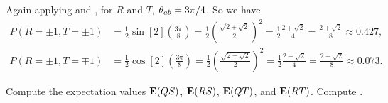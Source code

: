 \begin{solution}
	Again applying  and , for $R$ and $T$, $\theta_{ab} = 3\pi / 4$.  So we have
	\begin{align*}
		P(R=\pm1, T=\pm1) &= \frac{1}{2} \sin[2](\frac{3\pi}{8})
		= \frac{1}{2} \left( \frac{\sqrt{2 + \sqrt{2}}}{2} \right)^2
		= \frac{1}{2} \frac{2 + \sqrt{2}}{4}
		= \frac{2 + \sqrt{2}}{8}
		\approx 0.427, \\
		P(R=\pm1, T=\mp1) &= \frac{1}{2} \cos[2](\frac{3\pi}{8})
		= \frac{1}{2} \left( \frac{\sqrt{2 - \sqrt{2}}}{2} \right)^2
		= \frac{1}{2} \frac{2 - \sqrt{2}}{4}
		= \frac{2 - \sqrt{2}}{8}
		\approx 0.073.
	\end{align*}
	\vfix
\end{solution}



\begin{problem}
	Compute the expectation values $\vb{E}(QS)$, $\vb{E}(RS)$, $\vb{E}(QT)$, and $\vb{E}(RT)$.  Compute
	\beq
		.
	\eeq
	\vfix
\end{problem}


